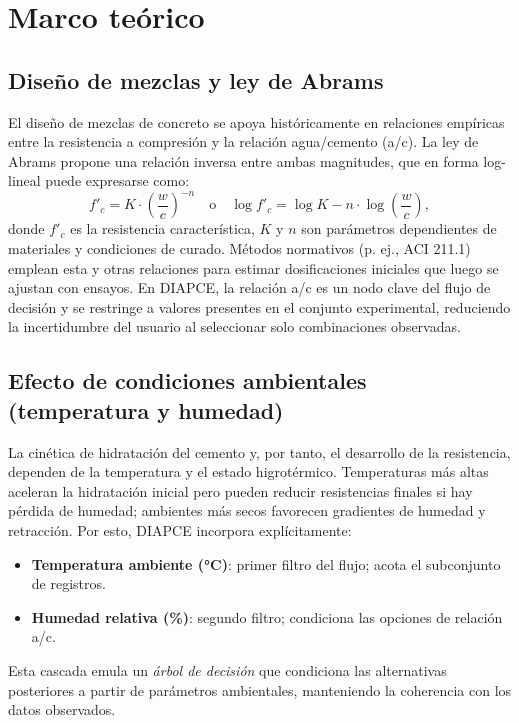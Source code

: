 \documentclass[12pt, letterpaper]{article}
\begin{document}
\section{Marco teórico}
\subsection{Diseño de mezclas y ley de Abrams}
El diseño de mezclas de concreto se apoya históricamente en relaciones empíricas entre la resistencia a compresión y la relación agua/cemento (a/c). La ley de Abrams propone una relación inversa entre ambas magnitudes, que en forma log-lineal puede expresarse como:
\[
f'_c = K \cdot \left(\frac{w}{c}\right)^{-n}
\quad\text{o}\quad
\log f'_c = \log K - n \cdot \log\!\left(\frac{w}{c}\right),
\]
donde $f'_c$ es la resistencia característica, $K$ y $n$ son parámetros dependientes de materiales y condiciones de curado. Métodos normativos (p. ej., ACI 211.1) emplean esta y otras relaciones para estimar dosificaciones iniciales que luego se ajustan con ensayos. En DIAPCE, la relación a/c es un nodo clave del flujo de decisión y se restringe a valores presentes en el conjunto experimental, reduciendo la incertidumbre del usuario al seleccionar solo combinaciones observadas.

\subsection{Efecto de condiciones ambientales (temperatura y humedad)}
La cinética de hidratación del cemento y, por tanto, el desarrollo de la resistencia, dependen de la temperatura y el estado higrotérmico. Temperaturas más altas aceleran la hidratación inicial pero pueden reducir resistencias finales si hay pérdida de humedad; ambientes más secos favorecen gradientes de humedad y retracción. Por esto, DIAPCE incorpora explícitamente:
\begin{itemize}
    \item \textbf{Temperatura ambiente (°C)}: primer filtro del flujo; acota el subconjunto de registros.
    \item \textbf{Humedad relativa (\%)}: segundo filtro; condiciona las opciones de relación a/c.
\end{itemize}
Esta cascada emula un \textit{árbol de decisión} que condiciona las alternativas posteriores a partir de parámetros ambientales, manteniendo la coherencia con los datos observados.
\end{document}
